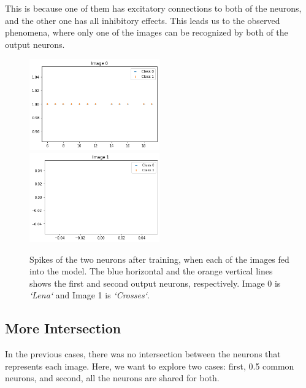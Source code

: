 \documentclass{article}
\begin{document}
	This is because one of them has excitatory connections to both of the neurons, and the other one has all inhibitory effects. This leads us to the observed phenomena, where only one of the images can be recognized by both of the output neurons.
	\begin{figure}[h]
		\includegraphics[width=0.5\textwidth]{test11.png}
		\includegraphics[width=0.5\textwidth]{test12.png}
		\caption{Spikes of the two neurons after training, when each of the images fed into the model. The blue horizontal and the orange vertical lines shows the first and second output neurons, respectively. Image 0 is \textit{`Lena`} and Image 1 is \textit{`Crosses`}.}
		\label{fig:test1}
		
	\end{figure}
	\subsection{More Intersection}
	In the previous cases, there was no intersection between the neurons that represents each image. Here, we want to explore two cases: first, 0.5 common neurons, and second, all the neurons are shared for both.
	
\end{document}

